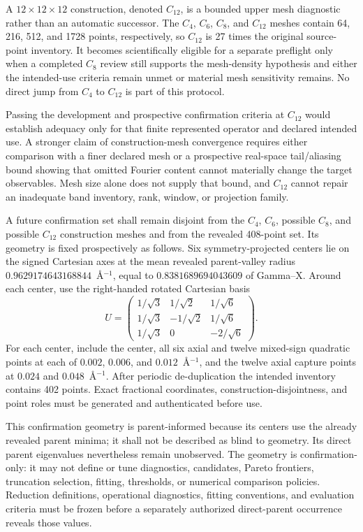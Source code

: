 \documentclass[11pt]{report}
\begin{document}
A $12\times12\times12$ construction, denoted $C_{12}$, is a bounded upper mesh
diagnostic rather than an automatic successor.  The $C_4$, $C_6$, $C_8$, and $C_{12}$
meshes contain 64, 216, 512, and 1728 points, respectively, so $C_{12}$ is 27 times the
original source-point inventory.  It becomes scientifically eligible for a separate
preflight only when a completed $C_8$ review still supports the mesh-density hypothesis
and either the intended-use criteria remain unmet or material mesh sensitivity remains.
No direct jump from $C_4$ to $C_{12}$ is part of this protocol.

Passing the development and prospective confirmation criteria at $C_{12}$ would
establish adequacy only for that finite represented operator and declared intended use.
A stronger claim of construction-mesh convergence requires either comparison with a
finer declared mesh or a prospective real-space tail/aliasing bound showing that omitted
Fourier content cannot materially change the target observables.  Mesh size alone does
not supply that bound, and $C_{12}$ cannot repair an inadequate band inventory, rank,
window, or projection family.

A future confirmation set shall remain disjoint from the $C_4$, $C_6$, possible $C_8$,
and possible $C_{12}$ construction meshes and from the revealed 408-point set.  Its geometry is fixed
prospectively as follows.  Six symmetry-projected centers lie on the signed Cartesian
axes at the mean revealed parent-valley radius
$0.9629174643168844$~\AA$^{-1}$, equal to $0.8381689694043609$ of Gamma--X.  Around each
center, use the right-handed rotated Cartesian basis
\begin{equation}
 U=\begin{pmatrix}
 1/\sqrt{3} &  1/\sqrt{2} &  1/\sqrt{6} \\
 1/\sqrt{3} & -1/\sqrt{2} &  1/\sqrt{6} \\
 1/\sqrt{3} &  0           & -2/\sqrt{6}
 \end{pmatrix}.
\end{equation}
For each center, include the center, all six axial and twelve mixed-sign quadratic
points at each of $0.002$, $0.006$, and $0.012$~\AA$^{-1}$, and the twelve axial capture
points at $0.024$ and $0.048$~\AA$^{-1}$.  After periodic de-duplication the intended
inventory contains 402 points.  Exact fractional coordinates, construction-disjointness,
and point roles must be generated and authenticated before use.

This confirmation geometry is parent-informed because its centers use the already
revealed parent minima; it shall not be described as blind to geometry.  Its direct
parent eigenvalues nevertheless remain unobserved.  The geometry is confirmation-only:
it may not define or tune diagnostics, candidates, Pareto frontiers, truncation
selection, fitting, thresholds, or numerical comparison policies.  Reduction
definitions, operational diagnostics, fitting conventions, and evaluation criteria must
be frozen before a separately authorized direct-parent occurrence reveals those values.
\end{document}
